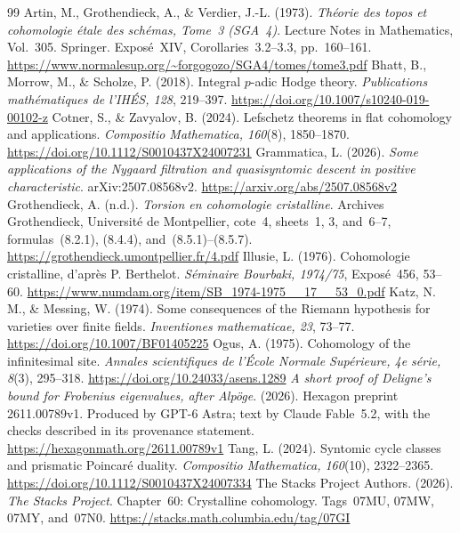 \documentclass[11pt]{article}
\theoremstyle{remark}\newtheorem{remark}[theorem]{Remark}
\begin{document}
\begin{thebibliography}{99}
Artin, M., Grothendieck, A., \& Verdier, J.-L. (1973). \emph{Th\'eorie des topos et cohomologie \'etale des sch\'emas, Tome~3 (SGA~4)}. Lecture Notes in Mathematics, Vol.~305. Springer. Expos\'e~XIV, Corollaries~3.2--3.3, pp.~160--161. \url{https://www.normalesup.org/~forgogozo/SGA4/tomes/tome3.pdf}
Bhatt, B., Morrow, M., \& Scholze, P. (2018). Integral $p$-adic Hodge theory. \emph{Publications math\'ematiques de l'IH\'ES, 128}, 219--397. \url{https://doi.org/10.1007/s10240-019-00102-z}
Cotner, S., \& Zavyalov, B. (2024). Lefschetz theorems in flat cohomology and applications. \emph{Compositio Mathematica, 160}(8), 1850--1870. \url{https://doi.org/10.1112/S0010437X24007231}
Grammatica, L. (2026). \emph{Some applications of the Nygaard filtration and quasisyntomic descent in positive characteristic}. arXiv:2507.08568v2. \url{https://arxiv.org/abs/2507.08568v2}
Grothendieck, A. (n.d.). \emph{Torsion en cohomologie cristalline}. Archives Grothendieck, Universit\'e de Montpellier, cote~4, sheets~1, 3, and~6--7, formulas~(8.2.1), (8.4.4), and~(8.5.1)--(8.5.7). \url{https://grothendieck.umontpellier.fr/4.pdf}
Illusie, L. (1976). Cohomologie cristalline, d'apr\`es P. Berthelot. \emph{S\'eminaire Bourbaki, 1974/75}, Expos\'e~456, 53--60. \url{https://www.numdam.org/item/SB_1974-1975__17__53_0.pdf}
Katz, N. M., \& Messing, W. (1974). Some consequences of the Riemann hypothesis for varieties over finite fields. \emph{Inventiones mathematicae, 23}, 73--77. \url{https://doi.org/10.1007/BF01405225}
Ogus, A. (1975). Cohomology of the infinitesimal site. \emph{Annales scientifiques de l'\'Ecole Normale Sup\'erieure, 4e s\'erie, 8}(3), 295--318. \url{https://doi.org/10.24033/asens.1289}
\emph{A short proof of Deligne's bound for Frobenius eigenvalues, after Alp\"oge}. (2026). Hexagon preprint 2611.00789v1. Produced by GPT-6 Astra; text by Claude Fable~5.2, with the checks described in its provenance statement. \url{https://hexagonmath.org/2611.00789v1}
Tang, L. (2024). Syntomic cycle classes and prismatic Poincar\'e duality. \emph{Compositio Mathematica, 160}(10), 2322--2365. \url{https://doi.org/10.1112/S0010437X24007334}
The Stacks Project Authors. (2026). \emph{The Stacks Project}. Chapter~60: Crystalline cohomology. Tags~07MU, 07MW, 07MY, and~07N0. \url{https://stacks.math.columbia.edu/tag/07GI}
\end{thebibliography}
\end{document}

